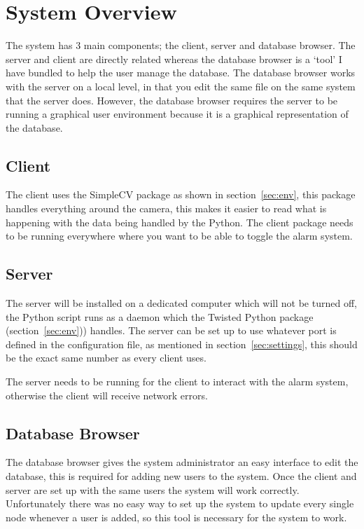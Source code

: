 \documentclass[12pt,a4paper]{report}
\begin{document}
\section{System Overview}
The system has 3 main components; the client, server and database browser. The server and client are directly related
whereas the database browser is a `tool' I have bundled to help the user manage the database. The database browser works
with the server on a local level, in that you edit the same file on the same system that the server does. However,
the database browser requires the server to be running a graphical user environment because it is a graphical representation
of the database. 

    \subsection{Client}
    The client uses the SimpleCV package as shown in section~\ref{sec:env}, this package handles everything around the camera,
    this makes it easier to read what is happening with the data being handled by the Python. The client package needs to be
    running everywhere where you want to be able to toggle the alarm system. 

    \subsection{Server}
    The server will be installed on a dedicated computer which will not be turned off, the Python script runs as a daemon
    which the Twisted Python package (section~\ref{sec:env})) handles. The server can be set up to use whatever port is defined
    in the configuration file, as mentioned in section~\ref{sec:settings}, this should be the exact same number as every client
    uses.

    The server needs to be running for the client to interact with the alarm system, otherwise the client will receive network
    errors.

    \subsection{Database Browser}
    The database browser gives the system administrator an easy interface to edit the database, this is required for
    adding new users to the system. Once the client and server are set up with the same users the system will work
    correctly. Unfortunately there was no easy way to set up the system to update every single node whenever a user is
    added, so this tool is necessary for the system to work.
\end{document}

